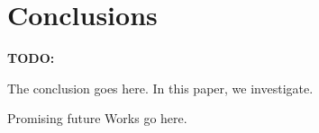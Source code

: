 \documentclass[conference]{IEEEtran}
\begin{document}

\section{Conclusions} \label{conclusion}
\textbf{TODO: }

The conclusion goes here. In this paper, we investigate.

Promising future Works go here.












\end{document}
